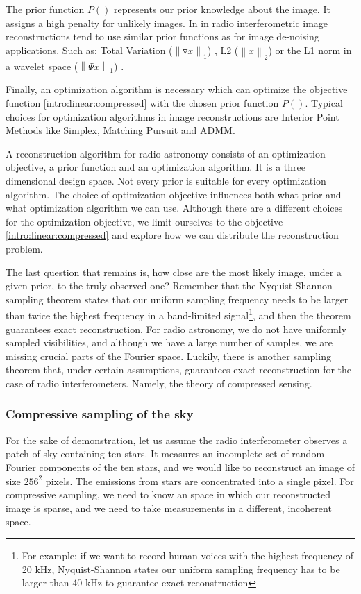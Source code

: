 The prior function $P()$ represents our prior knowledge about the image. It assigns a high penalty for unlikely images. In in radio interferometric image reconstructions tend to use similar prior functions as for image de-noising applications. Such as: Total Variation ($\left \| \triangledown x \right \|_1$) \cite{wiaux2009compressed}, L2 ($\left \|x \right \|_2$) \cite{ferrari2014distributed} or the L1 norm in a wavelet space ($\left \|\Psi x \right \|_1$) \cite{girard2015sparse}.

Finally, an optimization algorithm is necessary which can optimize the objective function \eqref{intro:linear:compressed} with the chosen prior function $P()$. Typical choices for optimization algorithms in image reconstructions are Interior Point Methods like Simplex, Matching Pursuit \cite{hogbom1974aperture} and ADMM\cite{carrillo2014purify}. 

A reconstruction algorithm for radio astronomy consists of an optimization objective, a prior function and an optimization algorithm. It is a three dimensional design space. Not every prior is suitable for every optimization algorithm. The choice of optimization objective influences both what prior and what optimization algorithm we can use. Although there are a different choices for the optimization objective, we limit ourselves to the objective \eqref{intro:linear:compressed} and explore how we can distribute the reconstruction problem.

The last question that remains is, how close are the most likely image, under a given prior, to the truly observed one? Remember that the Nyquist-Shannon sampling theorem states that our uniform sampling frequency needs to be larger than twice the highest frequency in a band-limited signal\footnote{For example: if we want to record human voices with the highest frequency of 20 kHz, Nyquist-Shannon states our uniform sampling frequency has to be larger than 40 kHz to guarantee exact reconstruction}, and then the theorem guarantees exact reconstruction. For radio astronomy, we do not have uniformly sampled visibilities, and although we have a large number of samples, we are missing crucial parts of the Fourier space. Luckily, there is another sampling theorem that, under certain assumptions, guarantees exact reconstruction for the case of radio interferometers. Namely, the theory of compressed sensing.

\subsubsection{Compressive sampling of the sky}
For the sake of demonstration, let us assume the radio interferometer observes a patch of sky containing ten stars. It measures an incomplete set of random Fourier components of the ten stars, and we would like to reconstruct an image of size $256^2$ pixels. The emissions from stars are concentrated into a single pixel. For compressive sampling, we need to know an space in which our reconstructed image is sparse, and we need to take measurements in a different, incoherent space.

